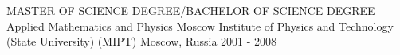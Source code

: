 
\begin{cventries}

  \cvblitz
    {MASTER OF SCIENCE DEGREE/BACHELOR OF SCIENCE DEGREE} %
    {Applied Mathematics and Physics}
    {Moscow Institute of Physics and Technology (State University) (MIPT)} %
    {Moscow, Russia} %
    {2001 - 2008} %

\end{cventries}
